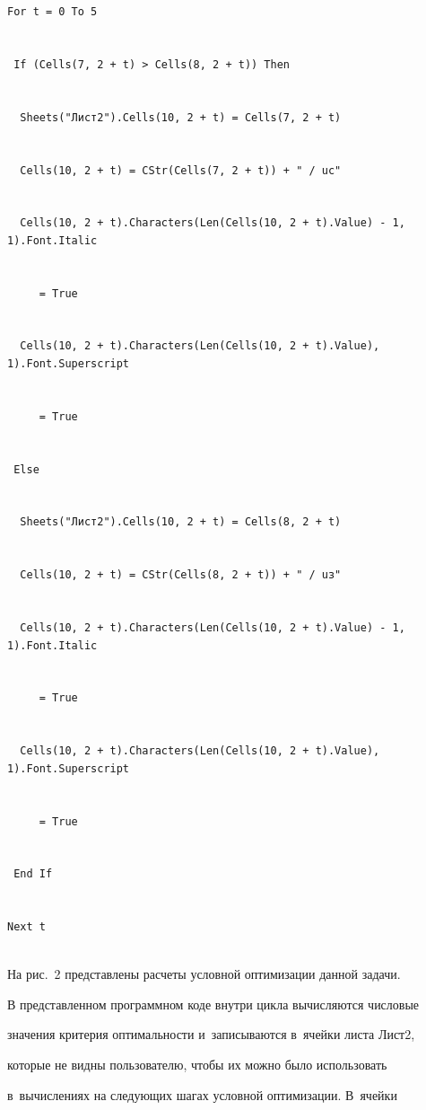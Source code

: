 \noindent


{\footnotesize


  \begin{verbatim}


For t = 0 To 5


 If (Cells(7, 2 + t) > Cells(8, 2 + t)) Then


  Sheets("Лист2").Cells(10, 2 + t) = Cells(7, 2 + t)


  Cells(10, 2 + t) = CStr(Cells(7, 2 + t)) + " / uc"


  Cells(10, 2 + t).Characters(Len(Cells(10, 2 + t).Value) - 1, 1).Font.Italic 


     = True


  Cells(10, 2 + t).Characters(Len(Cells(10, 2 + t).Value), 1).Font.Superscript 


     = True


 Else


  Sheets("Лист2").Cells(10, 2 + t) = Cells(8, 2 + t)


  Cells(10, 2 + t) = CStr(Cells(8, 2 + t)) + " / uз"


  Cells(10, 2 + t).Characters(Len(Cells(10, 2 + t).Value) - 1, 1).Font.Italic 


     = True


  Cells(10, 2 + t).Characters(Len(Cells(10, 2 + t).Value), 1).Font.Superscript 


     = True


 End If


Next t


\end{verbatim}





}


  


  На рис.~2 представлены расчеты условной оптимизации данной задачи.


  


  


  


  В представленном программном коде внутри цикла вычисляются числовые 


значения критерия оптимальности и~записываются в~ячейки листа Лист2, 


которые не видны пользователю, чтобы их можно было использовать 


в~вы\-чис\-ле\-ни\-ях на следующих шагах услов\-ной оптимизации. В~ячейки 


